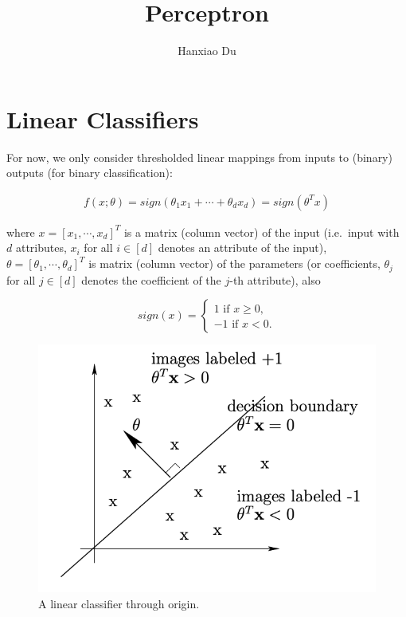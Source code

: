 \documentclass[12pt,a4paper]{article}
\title{Perceptron}
\author{Hanxiao Du}
\date{}
\begin{document}
\maketitle
\tableofcontents

\section{Linear Classifiers}

For now, we only consider thresholded linear mappings from inputs to
(binary) outputs (for binary classification):

\begin{align}
f(x;\theta)=sign(\theta_1x_1+\cdots+\theta_dx_d)=sign(\theta^Tx)
\end{align}

where \(x=[x_1,\cdots,x_d]^T\) is a matrix (column vector) of the input
(i.e.~input with \(d\) attributes, \(x_i\) for all \(i \in [d]\) denotes
an attribute of the input), \(\theta = [\theta_1,\cdots,\theta_d]^T\) is
matrix (column vector) of the parameters (or coefficients, \(\theta_j\)
for all \(j \in [d]\) denotes the coefficient of the \(j\)-th
attribute), also

\begin{equation}
sign(x)=\begin{cases} 1 \text{ if } x\geq0,\\ -1 \text{ if } x <0 \text{.}\end{cases}
\end{equation}

\begin{figure}[h]
\centering
\includegraphics[scale=0.7]{assets/figures/linear_classifier.png}
\caption{A linear classifier through origin.\label{linear_cls}}
\end{figure}
\end{document}
